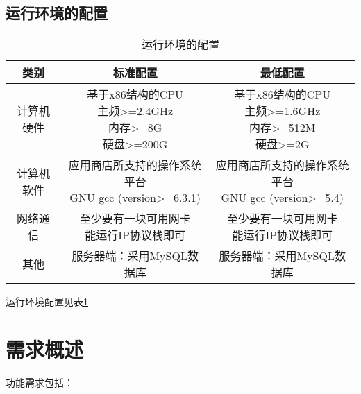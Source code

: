 \subsection{运行环境的配置}
\begin{table}[htbp]
\centering
\caption{运行环境的配置} \label{tab:operation-environment}
\begin{tabular}{|c|c|c|}
    \hline
    类别 & 标准配置 & 最低配置 \\
    \hline
    计算机硬件 & \tabincell{c}{基于x86结构的CPU\\ 主频>=2.4GHz\\ 内存>=8G\\ 硬盘>=200G} & \tabincell{c}{基于x86结构的CPU\\ 主频>=1.6GHz\\ 内存>=512M\\ 硬盘>=2G} \\
    \hline
    计算机软件 & \tabincell{c}{应用商店所支持的操作系统平台\\ GNU gcc (version>=6.3.1)} & \tabincell{c}{应用商店所支持的操作系统平台\\ GNU gcc (version>=5.4)} \\
    \hline
    网络通信 & \tabincell{c}{至少要有一块可用网卡\\ 能运行IP协议栈即可} & \tabincell{c}{至少要有一块可用网卡\\ 能运行IP协议栈即可} \\
    \hline
    其他 & 服务器端：采用MySQL数据库 & 服务器端：采用MySQL数据库 \\
    \hline

\end{tabular}
\end{table}

运行环境配置见表\ref{tab:operation-environment}

\section{需求概述}
功能需求包括：

